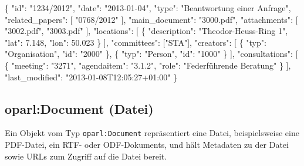 \documentclass[,a4paper]{article}
\newenvironment{Shaded}{}{}
\newcommand{\DataTypeTok}[1]{\textcolor[rgb]{0.56,0.13,0.00}{{#1}}}
\newcommand{\FloatTok}[1]{\textcolor[rgb]{0.25,0.63,0.44}{{#1}}}
\newcommand{\StringTok}[1]{\textcolor[rgb]{0.25,0.44,0.63}{{#1}}}
\newcommand{\NormalTok}[1]{{#1}}
\begin{document}
\begin{Shaded}
\begin{Highlighting}[]
\NormalTok{\{}
    \DataTypeTok{"id"}\NormalTok{: }\StringTok{"1234/2012"}\NormalTok{,}
    \DataTypeTok{"date"}\NormalTok{: }\StringTok{"2013-01-04"}\NormalTok{,}
    \DataTypeTok{"type"}\NormalTok{: }\StringTok{"Beantwortung einer Anfrage"}\NormalTok{,}
    \DataTypeTok{"related_papers"}\NormalTok{: [}
        \StringTok{"0768/2012"}
    \NormalTok{],}
    \DataTypeTok{"main_document"}\NormalTok{: }\StringTok{"3000.pdf"}\NormalTok{,}
    \DataTypeTok{"attachments"}\NormalTok{: [}
        \StringTok{"3002.pdf"}\NormalTok{,}
        \StringTok{"3003.pdf"}
    \NormalTok{],}
    \DataTypeTok{"locations"}\NormalTok{: [}
        \NormalTok{\{}
            \DataTypeTok{"description"}\NormalTok{: }\StringTok{"Theodor-Heuss-Ring 1"}\NormalTok{,}
            \DataTypeTok{"lat"}\NormalTok{: }\FloatTok{7.148}\NormalTok{,}
            \DataTypeTok{"lon"}\NormalTok{: }\FloatTok{50.023}
        \NormalTok{\}}
    \NormalTok{],}
    \DataTypeTok{"committees"}\NormalTok{: [}\StringTok{"STA"}\NormalTok{],}
    \DataTypeTok{"creators"}\NormalTok{: [}
        \NormalTok{\{}
            \DataTypeTok{"typ"}\NormalTok{: }\StringTok{"Organisation"}\NormalTok{,}
            \DataTypeTok{"id"}\NormalTok{: }\StringTok{"2000"}
        \NormalTok{\},}
        \NormalTok{\{}
            \DataTypeTok{"typ"}\NormalTok{: }\StringTok{"Person"}\NormalTok{,}
            \DataTypeTok{"id"}\NormalTok{: }\StringTok{"1000"}
        \NormalTok{\}}
    \NormalTok{],}
    \DataTypeTok{"consultations"}\NormalTok{: [}
        \NormalTok{\{}
            \DataTypeTok{"meeting"}\NormalTok{: }\StringTok{"3271"}\NormalTok{,}
            \DataTypeTok{"agendaitem"}\NormalTok{: }\StringTok{"3.1.2"}\NormalTok{,}
            \DataTypeTok{"role"}\NormalTok{: }\StringTok{"Federführende Beratung"}
        \NormalTok{\}}
    \NormalTok{],}
    \DataTypeTok{"last_modified"}\NormalTok{: }\StringTok{"2013-01-08T12:05:27+01:00"}
\NormalTok{\}}
\end{Highlighting}
\end{Shaded}

\subsection{oparl:Document (Datei)}\label{oparlux5fdocument}

Ein Objekt vom Typ \texttt{oparl:Document} repräsentiert eine Datei,
beispielsweise eine PDF-Datei, ein RTF- oder ODF-Dokuments, und hält
Metadaten zu der Datei sowie URLs zum Zugriff auf die Datei bereit.
\end{document}
